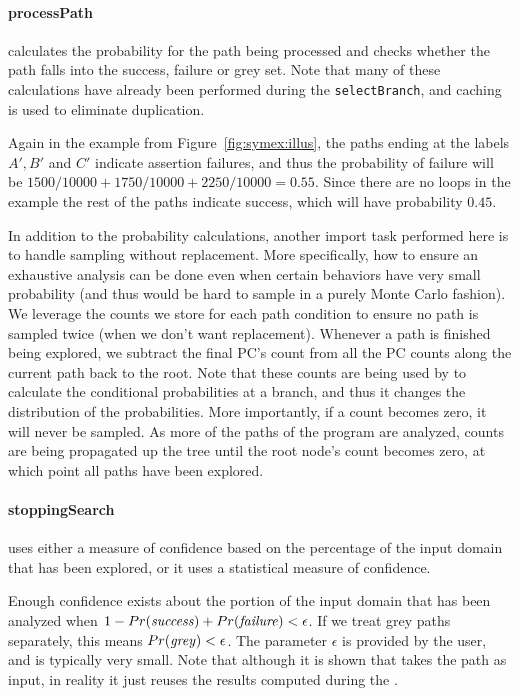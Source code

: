 \paragraph{processPath} calculates the probability for the path being processed and checks whether the path falls into the success, failure or grey set. Note that many of these calculations have already been performed during the {\tt selectBranch}, and caching is used to eliminate duplication. 

Again in the example from Figure~\ref{fig:symex:illus}, the paths ending at the labels $A', B'$ and $C'$ indicate assertion failures, and thus the probability of failure will be $1500/10000 + 1750/10000 + 2250/10000 = 0.55$.  Since there are no loops in the example the rest of the paths indicate success, which will have probability $0.45$.

In addition to the probability calculations, another import task performed here is to handle sampling without replacement. More specifically, how to ensure an exhaustive analysis can be done even when certain behaviors have very small probability (and thus would be hard to sample in a purely Monte Carlo fashion). We leverage the counts we store for each path condition to ensure no path is sampled twice (when we don't want replacement). Whenever a path is finished being explored, we subtract the final PC's count from all the PC counts along the current path back to the root. Note that these counts are being used by  to calculate the conditional probabilities at a branch, and thus it changes the distribution of the probabilities. More importantly, if a count becomes zero, it will never be sampled. As more of the paths of the program are analyzed, 
counts are being propagated up the tree until the root node's count becomes zero, at which point all paths have been explored. 

\paragraph{stoppingSearch} uses either a measure of confidence based on the percentage of the input domain that has been explored, or it uses a statistical measure of confidence. 

Enough confidence exists about the portion of the input domain that has been analyzed when  $1 - Pr(\mathit{success}) + Pr(\mathit{failure}) < \epsilon$.  If we treat grey paths separately, this means $Pr(\mathit{grey}) < \epsilon$. The parameter $\epsilon$ is provided by the user, and is typically very small. Note that although it is shown that  takes the path as input, in reality it just reuses the results computed during the . 

